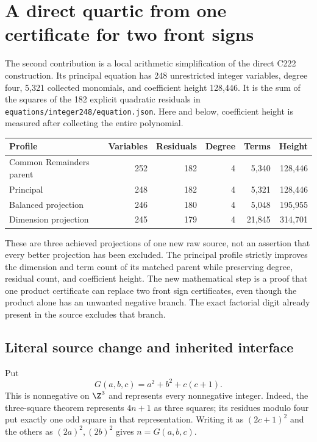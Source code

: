 \section{A direct quartic from one certificate for two front signs}
\label{sec:direct-front}

The second contribution is a local arithmetic simplification of the direct
C222 construction.  Its principal equation has 248 unrestricted integer
variables, degree four, 5,321 collected monomials, and coefficient height
128,446.  It is the sum of the squares of the 182 explicit quadratic
residuals in
\texttt{equations/integer248/equation.json}.  Here and below, coefficient
height is measured after collecting the entire polynomial.

\begin{center}
\begin{tabular}{lrrrrr}
Profile & Variables & Residuals & Degree & Terms & Height\\ \hline
Common Remainders parent & 252 & 182 & 4 & 5,340 & 128,446\\
Principal & 248 & 182 & 4 & 5,321 & 128,446\\
Balanced projection & 246 & 180 & 4 & 5,048 & 195,955\\
Dimension projection & 245 & 179 & 4 & 21,845 & 314,701
\end{tabular}
\end{center}

These are three achieved projections of one new raw source, not an
assertion that every better projection has been excluded.  The principal
profile strictly improves the dimension and term count of its matched
parent while preserving degree, residual count, and coefficient height.
The new mathematical step is a proof that one product certificate can
replace two front sign certificates, even though the product alone has
an unwanted negative branch.  The exact factorial digit already present
in the source excludes that branch.

\subsection{Literal source change and inherited interface}

Put
\[
 G(a,b,c)=a^2+b^2+c(c+1).
\]
This is nonnegative on $\Z^3$ and represents every nonnegative integer.
Indeed, the three-square theorem represents $4n+1$ as three squares; its
residues modulo four put exactly one odd square in that representation.
Writing it as $(2c+1)^2$ and the others as $(2a)^2,(2b)^2$ gives $n=G(a,b,c)$.

